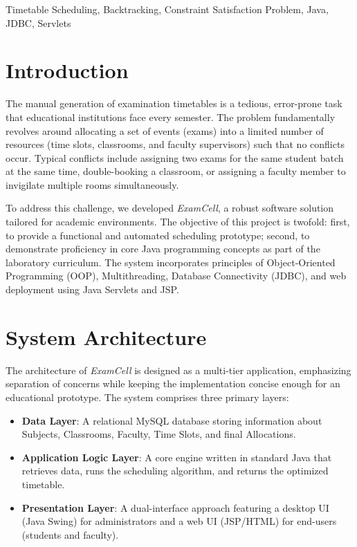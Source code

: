\documentclass[conference]{IEEEtran}
\begin{document}
\begin{IEEEkeywords}
Timetable Scheduling, Backtracking, Constraint Satisfaction Problem, Java, JDBC, Servlets
\end{IEEEkeywords}

\section{Introduction}
The manual generation of examination timetables is a tedious, error-prone task that educational institutions face every semester. The problem fundamentally revolves around allocating a set of events (exams) into a limited number of resources (time slots, classrooms, and faculty supervisors) such that no conflicts occur. Typical conflicts include assigning two exams for the same student batch at the same time, double-booking a classroom, or assigning a faculty member to invigilate multiple rooms simultaneously.

To address this challenge, we developed \textit{ExamCell}, a robust software solution tailored for academic environments. The objective of this project is twofold: first, to provide a functional and automated scheduling prototype; second, to demonstrate proficiency in core Java programming concepts as part of the laboratory curriculum. The system incorporates principles of Object-Oriented Programming (OOP), Multithreading, Database Connectivity (JDBC), and web deployment using Java Servlets and JSP.

\section{System Architecture}
The architecture of \textit{ExamCell} is designed as a multi-tier application, emphasizing separation of concerns while keeping the implementation concise enough for an educational prototype. The system comprises three primary layers:

\begin{itemize}
    \item \textbf{Data Layer}: A relational MySQL database storing information about Subjects, Classrooms, Faculty, Time Slots, and final Allocations.
    \item \textbf{Application Logic Layer}: A core engine written in standard Java that retrieves data, runs the scheduling algorithm, and returns the optimized timetable.
    \item \textbf{Presentation Layer}: A dual-interface approach featuring a desktop UI (Java Swing) for administrators and a web UI (JSP/HTML) for end-users (students and faculty).
\end{itemize}
\end{document}
